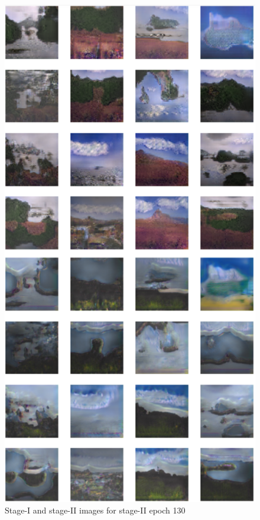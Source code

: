 \documentclass{article}
\begin{document}
	\begin{figure}[h]
	\centering
	\includegraphics[scale=0.6]{images/epoch130_FID410.png}
	\caption{Stage-I and stage-II images for stage-II epoch 130}
	\end{figure}
\end{document}
